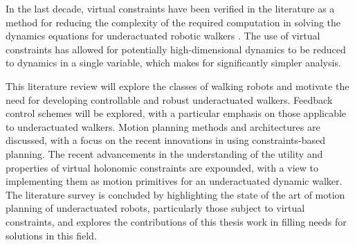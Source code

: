 In the last decade, virtual constraints have been verified in the literature as a method for reducing the complexity of the required computation in solving the dynamics equations for underactuated robotic walkers \cite{wetervelt2003hybrid, shiriaev2005constructive, shih2007asymptotically}. The use of virtual constraints has allowed for potentially high-dimensional dynamics to be reduced to dynamics in a single variable, which makes for significantly simpler analysis.

This literature review will explore the classes of walking robots and motivate the need for developing controllable and robust underactuated walkers. Feedback control schemes will be explored, with a particular emphasis on those applicable to underactuated walkers. Motion planning methods and architectures are discussed, with a focus on the recent innovations in using constraints-based planning. The recent advancements in the understanding of the utility and properties of virtual holonomic constraints are expounded, with a view to implementing them as motion primitives for an underactuated dynamic walker. The literature survey is concluded by highlighting the state of the art of motion planning of underactuated robots, particularly those subject to virtual constraints, and explores the contributions of this thesis work in filling needs for solutions in this field.
